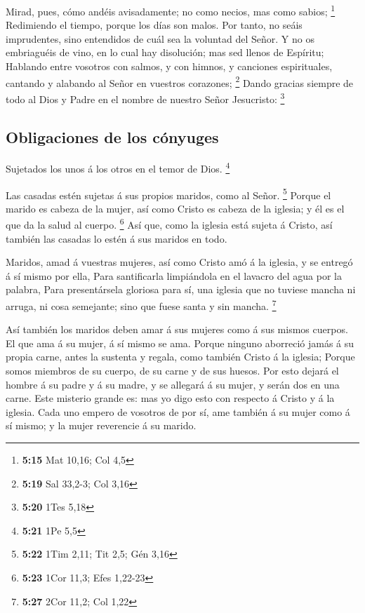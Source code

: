  Mirad, pues, cómo andéis avisadamente; no como necios, mas
como sabios; \footnote{\textbf{5:15} Mat 10,16; Col 4,5} 
Redimiendo el tiempo, porque los días son malos.  Por
tanto, no seáis imprudentes, sino entendidos de cuál sea la voluntad del
Señor.  Y no os embriaguéis de vino, en lo cual hay
disolución; mas sed llenos de Espíritu;  Hablando entre
vosotros con salmos, y con himnos, y canciones espirituales, cantando y
alabando al Señor en vuestros corazones; \footnote{\textbf{5:19} Sal
  33,2-3; Col 3,16}  Dando gracias siempre de todo al Dios
y Padre en el nombre de nuestro Señor Jesucristo: \footnote{\textbf{5:20}
  1Tes 5,18}

\hypertarget{obligaciones-de-los-cuxf3nyuges}{%
\subsection{Obligaciones de los
cónyuges}\label{obligaciones-de-los-cuxf3nyuges}}

 Sujetados los unos á los otros en el temor de Dios.
\footnote{\textbf{5:21} 1Pe 5,5}

 Las casadas estén sujetas á sus propios maridos, como al
Señor. \footnote{\textbf{5:22} 1Tim 2,11; Tit 2,5; Gén 3,16}
 Porque el marido es cabeza de la mujer, así como Cristo es
cabeza de la iglesia; y él es el que da la salud al cuerpo. \footnote{\textbf{5:23}
  1Cor 11,3; Efes 1,22-23}  Así que, como la iglesia está
sujeta á Cristo, así también las casadas lo estén á sus maridos en todo.

 Maridos, amad á vuestras mujeres, así como Cristo amó á la
iglesia, y se entregó á sí mismo por ella,  Para
santificarla limpiándola en el lavacro del agua por la palabra,
 Para presentársela gloriosa para sí, una iglesia que no
tuviese mancha ni arruga, ni cosa semejante; sino que fuese santa y sin
mancha. \footnote{\textbf{5:27} 2Cor 11,2; Col 1,22}

 Así también los maridos deben amar á sus mujeres como á
sus mismos cuerpos. El que ama á su mujer, á sí mismo se ama.
 Porque ninguno aborreció jamás á su propia carne, antes la
sustenta y regala, como también Cristo á la iglesia; 
Porque somos miembros de su cuerpo, de su carne y de sus huesos.
 Por esto dejará el hombre á su padre y á su madre, y se
allegará á su mujer, y serán dos en una carne.  Este
misterio grande es: mas yo digo esto con respecto á Cristo y á la
iglesia.  Cada uno empero de vosotros de por sí, ame
también á su mujer como á sí mismo; y la mujer reverencie á su marido.

